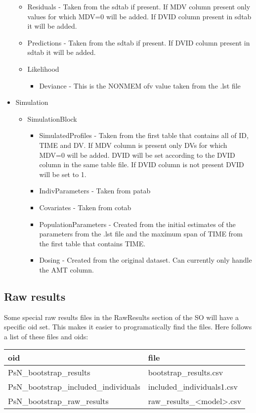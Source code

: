 \begin{itemize}
\begin{itemize}
            \item Residuals - Taken from the sdtab if present. If MDV column present only values for which MDV=0 will be added. If DVID column present in sdtab it will be added.
            \item Predictions - Taken from the sdtab if present. If DVID column present in sdtab it will be added.
            \item Likelihood
                \begin{itemize}
                    \item Deviance - This is the NONMEM ofv value taken from the .lst file
                \end{itemize}
        \end{itemize}
    \item Simulation 
        \begin{itemize}
            \item SimulationBlock    
            \begin{itemize}
                \item SimulatedProfiles - Taken from the first table that contains all of ID, TIME and DV. If MDV column is present only DVs for which MDV=0 will be added. DVID will be set according to the DVID column in the same table file. If DVID column is not present DVID will be set to 1.
                \item IndivParameters - Taken from patab
                \item Covariates - Taken from cotab
                \item PopulationParameters - Created from the initial estimates of the parameters from the .lst file and the maxímum span of TIME from the first table that contains TIME.
                \item Dosing - Created from the original dataset. Can currently only handle the AMT column.
            \end{itemize}
        \end{itemize}
\end{itemize}

\subsection{Raw results}
Some special raw results files in the RawResults section of the SO will have a specific oid set. This makes it easier to programatically find the files. Here follows a list of these files and oids:

\begin{tabular}{ l l}
      oid & file \\
    \hline
      PsN\_bootstrap\_results & bootstrap\_results.csv \\
      PsN\_bootstrap\_included\_individuals & included\_individuals1.csv \\
      PsN\_bootstrap\_raw\_results & raw\_results\_<model>.csv \\
\end{tabular}



